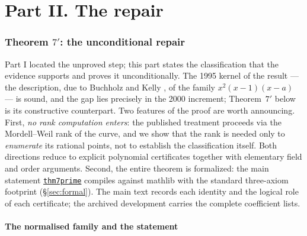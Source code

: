 \documentclass[11pt]{amsart}
\newcommand{\repourl}{https://github.com/hirokifukui/rd-quartics-classification}
\newcommand{\repotag}{v1.1.0}
\newcommand{\leanline}[3]{\href{\repourl/blob/\repotag/#1\#L#2}{\texttt{#3}}}
\begin{document}
\part*{Part II. The repair}

\section{Theorem $7'$: the unconditional repair}\label{sec:repair}

Part I located the unproved step; this part states the classification
that the evidence supports and proves it unconditionally.  The 1995
kernel of the result --- the description, due to Buchholz and Kelly
\cite{BK1995}, of the family $x^2(x-1)(x-a)$ --- is sound, and the gap
lies precisely in the 2000 increment; Theorem~$7'$ below is its
constructive counterpart.  Two features of the proof are worth
announcing.  First, \emph{no rank computation enters}: the published
treatment proceeds via the Mordell--Weil rank of the curve, and we show
that the rank is needed only to \emph{enumerate} its rational points,
not to establish the classification itself.  Both directions reduce to
explicit polynomial certificates together with elementary field and
order arguments.  Second, the entire theorem is
formalized: the main statement
\leanline{Thm7Prime/Master.lean}{619}{thm7prime} compiles against
mathlib with the standard three-axiom footprint (\S\ref{sec:formal}).  The main text records each identity and the
logical role of each certificate; the archived development carries the
complete coefficient lists.

\subsection{The normalised family and the statement}
\label{sec:repair:statement}
\end{document}
